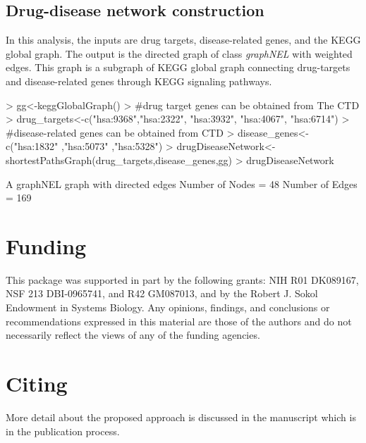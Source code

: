 \documentclass[11pt]{article}
\newcommand{\Rclass}[1]{{\textit{#1}}}
\begin{document}
\subsection{Drug-disease network construction }
In this analysis, the inputs are drug targets,
disease-related genes, and the KEGG global graph.
The output is the directed graph of class
\Rclass{graphNEL} with weighted edges.
This graph is a subgraph of KEGG global
graph connecting drug-targets and disease-related
genes through KEGG signaling pathways.

\begin{Schunk}
\begin{Sinput}
> gg<-keggGlobalGraph()
> #drug target genes can be obtained from The CTD
> drug_targets<-c("hsa:9368","hsa:2322", "hsa:3932", "hsa:4067", "hsa:6714")
> #disease-related genes can be obtained from CTD
> disease_genes<-c("hsa:1832" ,"hsa:5073" ,"hsa:5328")
> drugDiseaseNetwork<-shortestPathsGraph(drug_targets,disease_genes,gg)
> drugDiseaseNetwork
\end{Sinput}
\begin{Soutput}
A graphNEL graph with directed edges
Number of Nodes = 48 
Number of Edges = 169 
\end{Soutput}
\end{Schunk}

\section{Funding}
This package was supported in part
by the following grants: NIH R01 DK089167,
NSF 213 DBI-0965741, and R42 GM087013,
and by the Robert J. Sokol Endowment in
Systems Biology.
Any opinions, findings, and conclusions or
recommendations expressed in this material
are those of the authors and do not necessarily
reflect the views of any of the funding agencies.

\section{Citing}
More detail about the proposed approach
is discussed in the manuscript which is in
the publication process.



\end{document}
